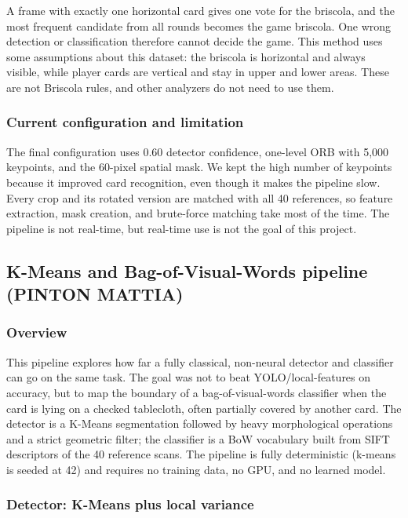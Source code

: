 \documentclass[11pt,a4paper]{article}
\begin{document}
A frame with exactly one horizontal card gives one vote for the briscola, and
the most frequent candidate from all rounds becomes the game briscola. One
wrong detection or classification therefore cannot decide the game. This method
uses some assumptions about this dataset: the briscola is horizontal and always
visible, while player cards are vertical and stay in upper and lower areas.
These are not Briscola rules, and other analyzers do not need to use them.

\subsubsection{Current configuration and limitation}

The final configuration uses 0.60 detector confidence, one-level ORB with
5,000 keypoints, and the 60-pixel spatial mask. We kept the high number of
keypoints because it improved card recognition, even though it makes the
pipeline slow. Every crop and its rotated version are matched with all 40
references, so feature extraction, mask creation, and brute-force matching take
most of the time. The pipeline is not real-time, but real-time use is not the
goal of this project.

\subsection{K-Means and Bag-of-Visual-Words pipeline (PINTON MATTIA)}

\subsubsection{Overview}

This pipeline explores how far a fully classical, non-neural detector and
classifier can go on the same task. The goal was not to beat YOLO/local-features
on accuracy, but to map the boundary of a bag-of-visual-words classifier when
the card is lying on a checked tablecloth, often partially covered by another
card. The detector is a K-Means segmentation followed by heavy morphological
operations and a strict geometric filter; the classifier is a BoW vocabulary built
from SIFT descriptors of the 40 reference scans. The pipeline is fully deterministic
(k-means is seeded at 42) and requires no training data, no GPU, and no learned model.

\subsubsection{Detector: K-Means plus local variance}
\end{document}
